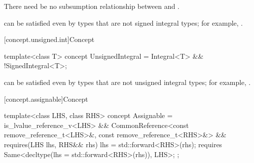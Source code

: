 \begin{itemdescr}
\pnum
There need be no subsumption relationship between
and
.

\pnum
\begin{note}
 can be satisfied even by types that are
not signed integral types; for example, .
\end{note}
\end{itemdescr}

[concept.unsigned.int]{Concept }

%
\begin{itemdecl}
template<class T>
concept UnsignedIntegral = Integral<T> && !SignedIntegral<T>;
\end{itemdecl}

\begin{itemdescr}
\pnum
\begin{note}
 can be satisfied even by types that are
not unsigned integral types; for example, .
\end{note}
\end{itemdescr}

[concept.assignable]{Concept }

%
\begin{itemdecl}
template<class LHS, class RHS>
concept Assignable =
  is_lvalue_reference_v<LHS> &&
  CommonReference<const remove_reference_t<LHS>&, const remove_reference_t<RHS>&> &&
  requires(LHS lhs, RHS&& rhs) {
    lhs = std::forward<RHS>(rhs);
    requires Same<decltype(lhs = std::forward<RHS>(rhs)), LHS>;
  };
\end{itemdecl}

